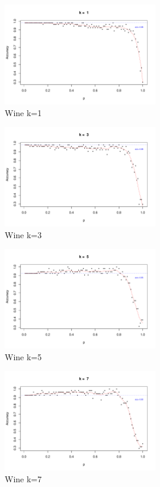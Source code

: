 \documentclass{article}
\begin{document}
\begin{figure}[h!]
 \centering
 \includegraphics[width=0.6\textwidth]{./figures/Wine_k1.pdf}
 \caption{Wine k=1}
 \label{fig:Wine1}
\end{figure}
\begin{figure}[h!]
 \centering
 \includegraphics[width=0.6\textwidth]{./figures/Wine_k3.pdf}
 \caption{Wine k=3}
 \label{fig:Wine3}
\end{figure}
\begin{figure}
 \centering
 \includegraphics[width=0.6\textwidth]{./figures/Wine_k5.pdf}
 \caption{Wine k=5}
 \label{fig:Wine5}
\end{figure}
\begin{figure}
 \centering
 \includegraphics[width=0.6\textwidth]{./figures/Wine_k7.pdf}
 \caption{Wine k=7}
 \label{fig:Wine7}
\end{figure}
\end{document}
